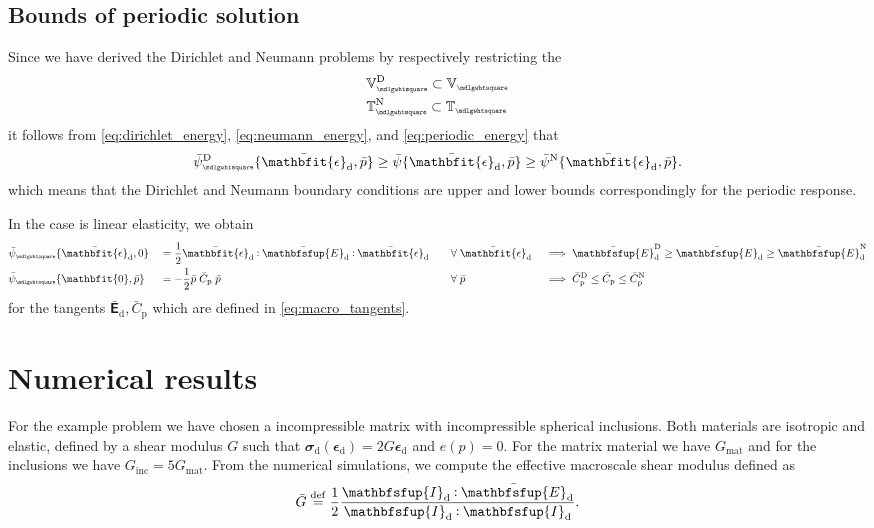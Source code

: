 \documentclass[12pt,a4paper]{article}
\renewcommand{\ts}[1]{\mathbfit{#1}}
\renewcommand{\tf}[1]{\mathbfsfup{#1}}
\renewcommand{\Box}{\mdlgwhtsquare}
\renewcommand{\dev}{\mathrm{d}}
\newcommand{\ded}{\mathrm{d}}
\newcommand{\dep}{\mathrm{p}}
\newcommand{\rve}{
  {\mathchoice
   {\mbox{\scalebox{0.67}{$\Box$}}}
   {\mbox{\scalebox{0.67}{$\Box$}}}
   {\mbox{\scalebox{0.5}{$\Box$}}}
   {\mbox{\scalebox{0.375}{$\Box$}}}
  }
}
\begin{document}
\subsection{Bounds of periodic solution}

Since we have derived the Dirichlet and Neumann problems by respectively restricting the 
\begin{align}
 &\set{V}_\rve^\Dirichlet \subset \set{V}_\rve\\
 &\set{T}_\rve^\Neumann \subset \set{T}_\rve
\end{align}
it follows from \eqref{eq:dirichlet_energy}, \eqref{eq:neumann_energy}, and \eqref{eq:periodic_energy} that
\begin{align}
 \bar\psi^\Dirichlet_\rve\{\bar{\ts\epsilon}_\dev, \bar{p}\} \geq \bar\psi\{\bar{\ts\epsilon}_\dev, \bar {p}\} \geq \bar\psi^\Neumann\{\bar{\ts\epsilon}_\dev, \bar {p}\}.
\end{align}
which means that the Dirichlet and Neumann boundary conditions are upper and lower bounds correspondingly for the periodic response.

In the case is linear elasticity, we obtain
\begin{alignat}{4}
 &\bar{\psi}_\rve\{\bar{\ts\epsilon}_\dev, 0\} &&= \frac12 \bar{\ts\epsilon}_\dev \dprod \bar{\tf E}_{\ded}\dprod \bar{\ts\epsilon}_\dev %
&\quad&\forall\;\bar{\ts\epsilon}_\dev &&\implies
 \bar{\tf E}_{\ded}^\Dirichlet \geq \bar{\tf E}_{\ded} \geq \bar{\tf E}_{\ded}^\Neumann
\\
 &\bar{\psi}_\rve\{\ts 0, \bar{p}\} &&= -\frac12 \bar{p}\;\bar{C}_{\dep}\;\bar{p} %
&\quad&\forall\;\bar{p} &&\implies
 \bar{C}_\dep^\Dirichlet \leq \bar{C}_\dep \leq \bar{C}_\dep^\Neumann
\end{alignat}
for the tangents $\bar{\tf E}_\ded, \bar{C}_\dep$ which are defined in \eqref{eq:macro_tangents}.



\section{Numerical results}
For the example problem we have chosen a incompressible matrix with incompressible spherical inclusions.
Both materials are isotropic and elastic, defined  by a shear modulus $G$ such that $\ts\sigma_\dev(\ts\epsilon_\dev) = 2 G \ts\epsilon_\dev$ and $e(p) = 0$.
For the matrix material we have $G_\mathrm{mat}$ and for the inclusions we have $G_\mathrm{inc} = 5 G_\mathrm{mat}$.
From the numerical simulations, we compute the effective macroscale shear modulus defined as
\begin{align}
 \bar{G} \defeq \frac12 \frac{\tf I_\dev \dprod \bar{\tf E}_\dev}{\tf I_\dev \dprod \tf I_\dev}.
\end{align}
\end{document}
